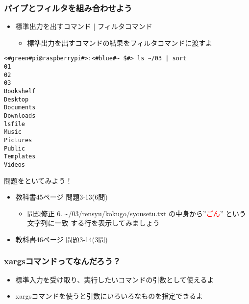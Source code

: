 \begin{frame}[fragile]
    \frametitle{パイプとフィルタを組み合わせよう}
    \begin{itemize}
        \item 標準出力を出すコマンド | フィルタコマンド
        \begin{itemize}
            \small
            \item[] 標準出力を出すコマンドの結果をフィルタコマンドに渡すよ
        \end{itemize}
    \end{itemize}
    \begin{lstlisting}[title=パイプラインを用いたsortコマンドの実行例, label=ppsort_example]
<#green#pi@raspberrypi#>:<#blue#~ $#> ls ~/03 | sort
01
02
03
Bookshelf
Desktop
Documents
Downloads
lsfile
Music
Pictures
Public
Templates
Videos
    \end{lstlisting}
\end{frame}

\begin{frame}
    \begin{exampleblock}{問題をといてみよう！}
        \begin{itemize}
            \item 教科書45ページ 問題3-13(6問)
            \begin{itemize}
                \item 問題修正 6. \textasciitilde/03/rensyu/kokugo/syousetu.txt の中身から”\textcolor{red}{ごん}” という文字列に一致
                する行を表示してみましょう
            \end{itemize}
            \item 教科書46ページ 問題3-14(3問)
        \end{itemize}
    \end{exampleblock} 
\end{frame}

\begin{frame}
    \frametitle{xargsコマンドってなんだろう？}
    \begin{itemize}
        \item 標準入力を受け取り、実行したいコマンドの引数として使えるよ
        \item xargsコマンドを使うと引数にいろいろなものを指定できるよ
    \end{itemize}
    \begin{figure}
        \centering
        
    \end{figure}
\end{frame}

